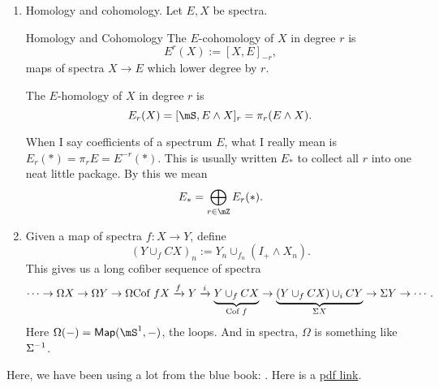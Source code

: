\begin{enumerate}
    Consider the map $f:\mS\to \mS$ which is a degree 2 map, so we have maps $S^{n+2}\to S^n$. Note that $S^2\to S^0$ is nullhomotopic. $S^3\to S^1$ is nullhomotopic. However, $S^4\to S^2$ is not nullhomotopic and can be represented by $\eta^2$ (look up the Hopf map! There are several cool links if you ask one of us about them). 

    Here is yet another construction!
    \begin{definition}{Maps between spectra, version 3}{}
        A map of spectra $f:E\to F$ of degree $r$ is a homotopy class of functions of spectra $f:E\to F$ of degree $r$ where the function is defined ``in the limit.'' Find the maps between high enough $E_N$, and worry about the early ones later on. Scotty heard from his advisor that this philosophy is ``cells now, maps later.''
    \end{definition}
     When we talk about maps from spectra to spectra of degree $r$, we denote the collection of homotopy classes of maps of degree $r$ between the two spectra as $$[E,F]_r.$$
    \item Homology and cohomology. Let $E,X$ be spectra. 
    
    \begin{definition}{Homology and Cohomology}{}
        The $E$-cohomology of $X$ in degree $r$ is $$E^r(X):=[X,E]_{-r},$$ maps of spectra $X\to E$ which lower degree by $r$. 
    
        The $E$-homology of $X$ in degree $r$ is $$E_r(X)=[\mS,E\wedge X]_r = \pi_r(E\wedge X).$$
    \end{definition}
    When I say coefficients of a spectrum $E$, what I really mean is $E_r(\ast) = \pi_r E = E^{-r}(\ast)$. This is usually written $E_\ast$ to collect all $r$ into one neat little package. By this we mean $$E_\ast = \bigoplus_{r\in \mZ} E_r(\ast).$$
    \item Given a map of spectra $f:X\to Y$, define $$(Y\cup_f CX)_n:=Y_n\cup_{f_n}(I_+\wedge X_n).$$ This gives us a long cofiber sequence of spectra $$\cdots\to\Omega X\to \Omega Y\to\Omega \text{Cof } fX\xrightarrow{f}Y\xrightarrow{i}\underbrace{Y\cup_f CX}_{\text{Cof }f}\to \underbrace{(Y\cup_f CX)\cup_i CY}_{\Sigma X}\to \Sigma Y\to \cdots.$$ Here $\Omega(-) = \mathsf{Map}(\mS^1,-)$, the loops. And in spectra, $\Omega$ is something like $\Sigma^{-1}$. 
\end{enumerate}
Here, we have been using a lot from the blue book: \cite[pg. 123, \S 3]{adams1974stable}. Here is a \href{https://people.math.rochester.edu/faculty/doug/otherpapers/Adams-SHGH.pdf}{pdf link}. 


